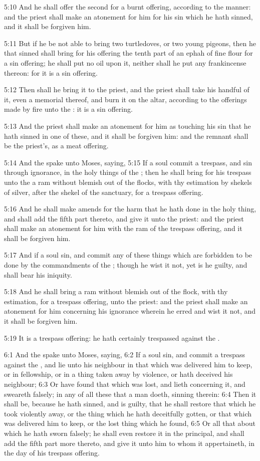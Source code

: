 5:10 And he shall offer the second for a burnt offering, according to the manner: and the priest shall make an atonement for him for his sin which he hath sinned, and it shall be forgiven him.

5:11 But if he be not able to bring two turtledoves, or two young pigeons, then he that sinned shall bring for his offering the tenth part of an ephah of fine flour for a sin offering; he shall put no oil upon it, neither shall he put any frankincense thereon: for it is a sin offering.

5:12 Then shall he bring it to the priest, and the priest shall take his handful of it, even a memorial thereof, and burn it on the altar, according to the offerings made by fire unto the \LORD: it is a sin offering.

5:13 And the priest shall make an atonement for him as touching his sin that he hath sinned in one of these, and it shall be forgiven him: and the remnant shall be the priest's, as a meat offering.

5:14 And the \LORD spake unto Moses, saying, 5:15 If a soul commit a trespass, and sin through ignorance, in the holy things of the \LORD; then he shall bring for his trespass unto the \LORD a ram without blemish out of the flocks, with thy estimation by shekels of silver, after the shekel of the sanctuary, for a trespass offering.

5:16 And he shall make amends for the harm that he hath done in the holy thing, and shall add the fifth part thereto, and give it unto the priest: and the priest shall make an atonement for him with the ram of the trespass offering, and it shall be forgiven him.

5:17 And if a soul sin, and commit any of these things which are forbidden to be done by the commandments of the \LORD; though he wist it not, yet is he guilty, and shall bear his iniquity.

5:18 And he shall bring a ram without blemish out of the flock, with thy estimation, for a trespass offering, unto the priest: and the priest shall make an atonement for him concerning his ignorance wherein he erred and wist it not, and it shall be forgiven him.

5:19 It is a trespass offering: he hath certainly trespassed against the \LORD.

6:1 And the \LORD spake unto Moses, saying, 6:2 If a soul sin, and commit a trespass against the \LORD, and lie unto his neighbour in that which was delivered him to keep, or in fellowship, or in a thing taken away by violence, or hath deceived his neighbour; 6:3 Or have found that which was lost, and lieth concerning it, and sweareth falsely; in any of all these that a man doeth, sinning therein: 6:4 Then it shall be, because he hath sinned, and is guilty, that he shall restore that which he took violently away, or the thing which he hath deceitfully gotten, or that which was delivered him to keep, or the lost thing which he found, 6:5 Or all that about which he hath sworn falsely; he shall even restore it in the principal, and shall add the fifth part more thereto, and give it unto him to whom it appertaineth, in the day of his trespass offering.

